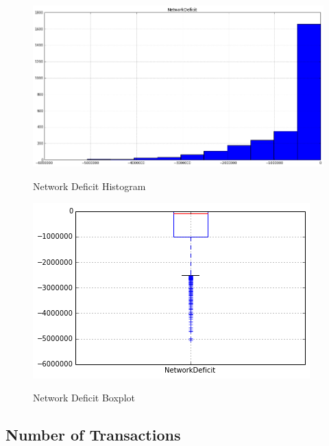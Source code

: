 \begin{figure}[bth]
  \myfloatalign
  {\includegraphics[width=1\linewidth]
    {gfx/network-deficit-histogram}}
  \caption{Network Deficit Histogram}
  \label{fig:network-deficit-histogram}
\end{figure}

\begin{figure}[bth]
  \myfloatalign
  {\includegraphics[width=1\linewidth]
    {gfx/network-deficit-boxplot}}
  \caption{Network Deficit Boxplot}
  \label{fig:network-deficit-boxplot}
\end{figure}

\clearpage

\subsection{Number of Transactions}
\label{sec:n-transactions-multiple}


